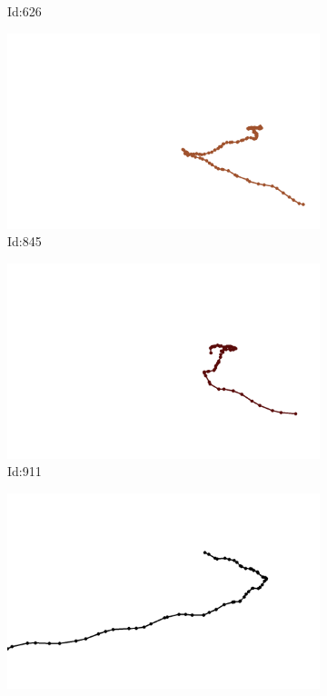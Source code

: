 \documentclass[12pt,twoside]{report}
\begin{document}
\begin{figure}
\begin{subfigure}[b]{0.20\textwidth}
\caption{Id:626}
\end{subfigure}
\begin{subfigure}[b]{0.20\textwidth}
\centering
\includegraphics[width=\textwidth]{../../trajectories/845.png}
\caption{Id:845}
\end{subfigure}
\begin{subfigure}[b]{0.20\textwidth}
\centering
\includegraphics[width=\textwidth]{../../trajectories/911.png}
\caption{Id:911}
\end{subfigure}
\begin{subfigure}[b]{0.20\textwidth}
\centering
\includegraphics[width=\textwidth]{../../trajectories/962.png}

\end{subfigure}
\end{figure}
\end{document}
